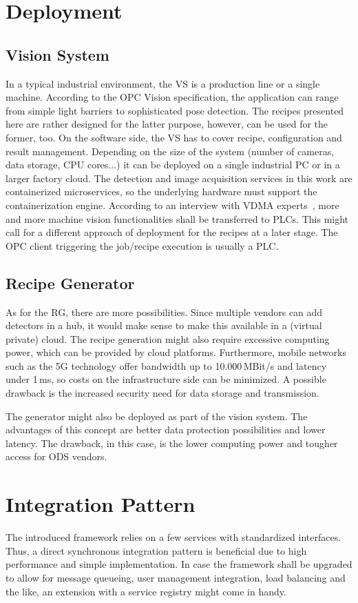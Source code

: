 \section{Deployment}
\subsection{Vision System}
In a typical industrial environment, the VS is a production line or a single machine. According to the OPC Vision specification, the application can range from simple light barriers to sophisticated pose detection. The recipes presented here are rather designed for the latter purpose, however, can be used for the former, too. On the software side, the VS has to cover recipe, configuration and result management. Depending on the size of the system (number of cameras, data storage, CPU cores...) it can be deployed on a single industrial PC or in a larger factory cloud. The detection and image acquisition services in this work are containerized microservices, so the underlying hardware must support the containerization engine. According to an interview with VDMA experts~\cite{VDMA2015OPC2019}, more and more machine vision functionalities shall be transferred to PLCs. This might call for a different approach of deployment for the recipes at a later stage. The OPC client triggering the job/recipe execution is usually a PLC.

\subsection{Recipe Generator}
As for the RG, there are more possibilities. Since multiple vendors can add detectors in a hub, it would make sense to make this available in a (virtual private) cloud. The recipe generation might also require excessive computing power, which can be provided by cloud platforms. Furthermore, mobile networks such as the 5G technology offer bandwidth up to 10.000\,MBit/s and latency under 1\,ms, so costs on the infrastructure side can be minimized. A possible drawback is the increased security need for data storage and transmission.

The generator might also be deployed as part of the vision system. The advantages of this concept are better data protection possibilities and lower latency. The drawback, in this case, is the lower computing power and tougher access for ODS vendors.

\section{Integration Pattern}
The introduced framework relies on a few services with standardized interfaces. Thus, a direct synchronous integration pattern is beneficial due to high performance and simple implementation. In case the framework shall be upgraded to allow for message queueing, user management integration, load balancing and the like, an extension with a service registry might come in handy.

